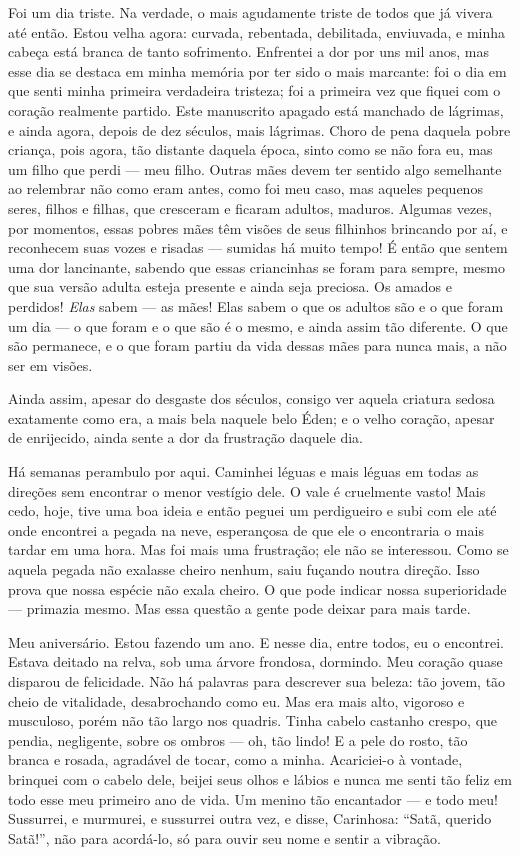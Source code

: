 Foi um dia triste. Na verdade, o mais agudamente triste de todos que já
vivera até então. Estou velha agora: curvada, rebentada,
debilitada, enviuvada, e minha cabeça está branca de tanto sofrimento. Enfrentei
a dor por uns mil anos, mas esse dia se destaca em minha memória por ter sido
o mais marcante: foi o dia em que senti minha primeira verdadeira tristeza; foi a
primeira vez que fiquei com o coração realmente partido. Este manuscrito apagado
está manchado de lágrimas, e ainda agora, depois de dez séculos, mais lágrimas.
Choro de pena daquela pobre criança, pois agora, tão distante
daquela época, sinto como se não fora eu, mas um filho que perdi --- 
meu filho. Outras mães devem ter sentido algo semelhante ao relembrar não como
eram antes, como foi meu caso, mas aqueles pequenos seres,
filhos e filhas, que cresceram e ficaram adultos, maduros. Algumas vezes,
por momentos, essas pobres mães têm visões de seus filhinhos brincando por aí, e
reconhecem suas vozes e risadas --- sumidas há muito tempo! É então que
sentem uma dor lancinante, sabendo que essas criancinhas se foram para sempre,
mesmo que sua versão adulta esteja presente e ainda seja preciosa. Os amados e
perdidos! \textit{Elas} sabem --- as mães! Elas sabem o que os adultos são e o que
foram um dia --- o que foram e o que são é o mesmo, e ainda assim tão diferente. O
que são permanece, e o que foram partiu da vida dessas mães para nunca mais, a
não ser em visões.

Ainda assim, apesar do desgaste dos séculos, consigo ver aquela criatura sedosa
exatamente como era, a mais bela naquele belo Éden; e o velho coração, apesar
de enrijecido, ainda sente a dor da frustração daquele dia.

 Há semanas perambulo por aqui. Caminhei léguas e mais léguas em todas as
direções sem encontrar o menor vestígio dele. O vale é cruelmente vasto! Mais cedo,
hoje, tive uma boa ideia e então peguei um perdigueiro e subi com ele até onde
encontrei a pegada na neve, esperançosa de que ele o encontraria o mais tardar em uma hora. Mas foi mais uma frustração;
ele não se interessou. Como se aquela pegada não exalasse cheiro nenhum, saiu
fuçando noutra direção. Isso prova que nossa espécie não exala cheiro. O
que pode indicar nossa superioridade --- primazia mesmo. Mas essa questão a gente pode
deixar para mais tarde.

 Meu aniversário. Estou fazendo um ano. E nesse dia, entre
todos, eu o encontrei. Estava deitado na relva, sob uma árvore frondosa, dormindo.
Meu coração quase disparou de felicidade. Não há palavras para descrever
sua beleza: tão jovem, tão cheio de vitalidade, desabrochando como eu. Mas era mais
alto, vigoroso e musculoso, porém não tão largo nos quadris. Tinha cabelo
castanho crespo, que pendia, negligente, sobre os ombros --- oh, tão lindo! E a pele
do rosto, tão branca e rosada, agradável de tocar, como a minha. Acariciei-o à
vontade, brinquei com o cabelo dele, beijei seus olhos e lábios e nunca me
senti tão feliz em todo esse meu primeiro ano de vida. Um menino tão encantador
--- e todo meu! Sussurrei, e murmurei, e sussurrei outra vez, e disse,
Carinhosa: “Satã, querido Satã!”, não para acordá-lo, só para ouvir seu
nome e sentir a vibração.

